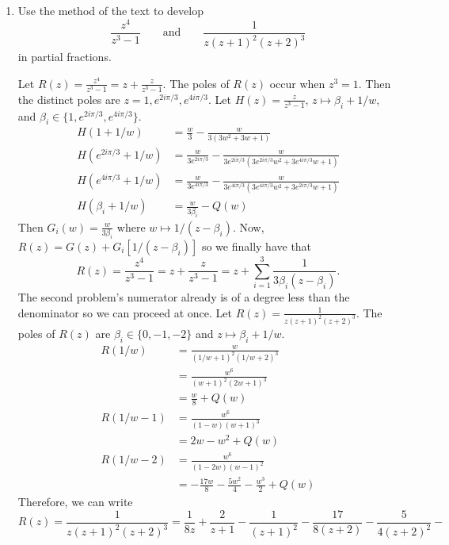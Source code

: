 \begin{enumerate}
\item
  Use the method of the text to develop
  \[
  \frac{z^4}{z^3 - 1}\qquad\text{and}\qquad\frac{1}{z(z + 1)^2(z + 2)^3}
  \]
  in partial fractions.
  \par\smallskip
  Let \(R(z) = \frac{z^4}{z^3 - 1} = z + \frac{z}{z^3 - 1}\).
  The poles of \(R(z)\) occur when \(z^3 = 1\).
  Then the distinct poles are \(z = 1,e^{2i\pi/3},e^{4i\pi/3}\).
  Let \(H(z) = \frac{z}{z^3 - 1}\), \(z\mapsto\beta_i + 1/w\), and
  \(\beta_i\in\{1,e^{2i\pi/3},e^{4i\pi/3}\}\).
  \begin{align*}
    H(1 + 1/w) & = \frac{w}{3} - \frac{w}{3(3w^2 + 3w + 1)}\\
    H(e^{2i\pi/3} + 1/w)
               & = \frac{w}{3e^{2i\pi/3}} - \frac{w}{3e^{2i\pi/3}
                 (3e^{2i\pi/3}w^2 + 3e^{4i\pi/3}w + 1)}\\
    H(e^{4i\pi/3} + 1/w)
               & = \frac{w}{3e^{4i\pi/3}} - \frac{w}{3e^{4i\pi/3}
                 (3e^{4i\pi/3}w^2 + 3e^{2i\pi/3}w + 1)}\\
    H(\beta_i + 1/w) & = \frac{w}{3\beta_i} - Q(w)
  \end{align*}
  Then \(G_i(w) = \frac{w}{3\beta_i}\) where \(w\mapsto 1/(z - \beta_i)\).
  Now, \(R(z) = G(z) + G_i[1/(z - \beta_i)]\) so we finally have that
  \[
  R(z) = \frac{z^4}{z^3 - 1} = z + \frac{z}{z^3 - 1} =
  z + \sum_{i = 1}^3\frac{1}{3\beta_i(z - \beta_i)}.
  \]
  The second problem's numerator already is of a degree less than the
  denominator so we can proceed at once.
  Let \(R(z) = \frac{1}{z(z + 1)^2(z + 2)^3}\).
  The poles of \(R(z)\) are \(\beta_i\in\{0,-1,-2\}\) and
  \(z\mapsto \beta_i + 1/w\).
  \begin{align*}
    R(1/w) & = \frac{w}{(1/w + 1)^2(1/w + 2)^3}\\
           & = \frac{w^6}{(w + 1)^2(2w + 1)^3}\\
           & = \frac{w}{8} + Q(w)\\
    R(1/w - 1) & = \frac{w^6}{(1 - w)(w + 1)^3}\\
           & = 2w - w^2 + Q(w)\\
    R(1/w - 2) & = \frac{w^6}{(1 - 2w)(w - 1)^2}\\
           & = -\frac{17w}{8} - \frac{5w^2}{4} - \frac{w^3}{2} + Q(w)
  \end{align*}
  Therefore, we can write
  \[
  R(z) = \frac{1}{z(z + 1)^2(z + 2)^3} = \frac{1}{8z} + \frac{2}{z + 1} -
  \frac{1}{(z + 1)^2} - \frac{17}{8(z + 2)} - \frac{5}{4(z + 2)^2} -
\]
\end{enumerate}
